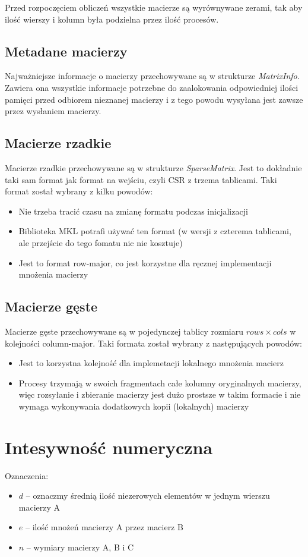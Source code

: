 \documentclass{article}
\begin{document}
Przed rozpoczęciem obliczeń wszystkie macierze są wyrównywane zerami, tak aby ilość wierszy i kolumn była podzielna przez ilość procesów.

\subsection{Metadane macierzy}
Najważniejsze informacje o macierzy przechowywane są w strukturze \emph{MatrixInfo}. Zawiera ona wszystkie informacje potrzebne 
do zaalokowania odpowiedniej ilości pamięci przed odbiorem nieznanej macierzy i z tego powodu wysyłana jest zawsze przez wysłaniem 
macierzy.

\subsection{Macierze rzadkie}
Macierze rzadkie przechowywane są w strukturze \emph{SparseMatrix}. Jest to dokładnie taki sam format jak format na wejściu, 
czyli CSR z trzema tablicami.
Taki format został wybrany z kilku powodów:
\begin{itemize}
  \item Nie trzeba tracić czasu na zmianę formatu podczas inicjalizacji
  \item Biblioteka MKL potrafi używać ten format (w wersji z czterema tablicami, ale przejście do tego fomatu nic nie kosztuje)
  \item Jest to format row-major, co jest korzystne dla ręcznej implementacji mnożenia macierzy
\end{itemize}

\subsection{Macierze gęste}
Macierze gęste przechowywane są w pojedynczej tablicy rozmiaru $rows \times cols$ w kolejności column-major.
Taki formata został wybrany z następujących powodów:
\begin{itemize}
  \item Jest to korzystna kolejność dla implemetacji lokalnego mnożenia macierz
  \item Procesy trzymają w swoich fragmentach całe kolumny oryginalnych macierzy, więc rozsyłanie i zbieranie macierzy jest dużo prostsze
           w takim formacie i nie wymaga wykonywania dodatkowych kopii (lokalnych) macierzy
\end{itemize} 

\section{Intesywność numeryczna}
Oznaczenia:
\begin{itemize}
  \item $d$ -- oznaczmy średnią ilość niezerowych elementów w jednym wierszu macierzy A
  \item $e$ -- ilość mnożeń macierzy A przez macierz B
  \item $n$ -- wymiary macierzy A, B i C
\end{itemize}
\end{document}
